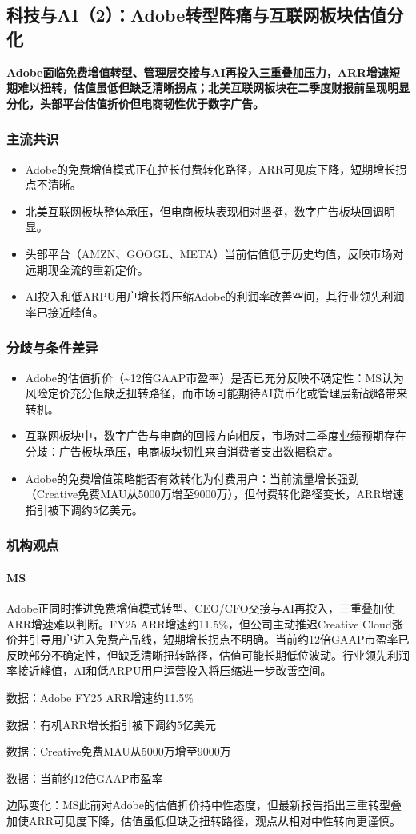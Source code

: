 \documentclass[11pt]{ctexart}
\begin{document}
\subsection{科技与AI（2）：Adobe转型阵痛与互联网板块估值分化}
\textbf{Adobe面临免费增值转型、管理层交接与AI再投入三重叠加压力，ARR增速短期难以扭转，估值虽低但缺乏清晰拐点；北美互联网板块在二季度财报前呈现明显分化，头部平台估值折价但电商韧性优于数字广告。}
\subsubsection*{主流共识}
\begin{itemize}
  \item Adobe的免费增值模式正在拉长付费转化路径，ARR可见度下降，短期增长拐点不清晰。
  \item 北美互联网板块整体承压，但电商板块表现相对坚挺，数字广告板块回调明显。
  \item 头部平台（AMZN、GOOGL、META）当前估值低于历史均值，反映市场对远期现金流的重新定价。
  \item AI投入和低ARPU用户增长将压缩Adobe的利润率改善空间，其行业领先利润率已接近峰值。
\end{itemize}
\subsubsection*{分歧与条件差异}
\begin{itemize}
  \item Adobe的估值折价（\textasciitilde{}12倍GAAP市盈率）是否已充分反映不确定性：MS认为风险定价充分但缺乏扭转路径，而市场可能期待AI货币化或管理层新战略带来转机。
  \item 互联网板块中，数字广告与电商的回报方向相反，市场对二季度业绩预期存在分歧：广告板块承压，电商板块韧性来自消费者支出数据稳定。
  \item Adobe的免费增值策略能否有效转化为付费用户：当前流量增长强劲（Creative免费MAU从5000万增至9000万），但付费转化路径变长，ARR增速指引被下调约5亿美元。
\end{itemize}
\subsubsection*{机构观点}
\paragraph{MS} Adobe正同时推进免费增值模式转型、CEO/CFO交接与AI再投入，三重叠加使ARR增速难以判断。FY25 ARR增速约11.5\%，但公司主动推迟Creative Cloud涨价并引导用户进入免费产品线，短期增长拐点不明确。当前约12倍GAAP市盈率已反映部分不确定性，但缺乏清晰扭转路径，估值可能长期低位波动。行业领先利润率接近峰值，AI和低ARPU用户运营投入将压缩进一步改善空间。
{\small\color{refgray}数据：Adobe FY25 ARR增速约11.5\%\par}
{\small\color{refgray}数据：有机ARR增长指引被下调约5亿美元\par}
{\small\color{refgray}数据：Creative免费MAU从5000万增至9000万\par}
{\small\color{refgray}数据：当前约12倍GAAP市盈率\par}
{\small\color{refgray}边际变化：MS此前对Adobe的估值折价持中性态度，但最新报告指出三重转型叠加使ARR可见度下降，估值虽低但缺乏扭转路径，观点从相对中性转向更谨慎。\par}
\end{document}
